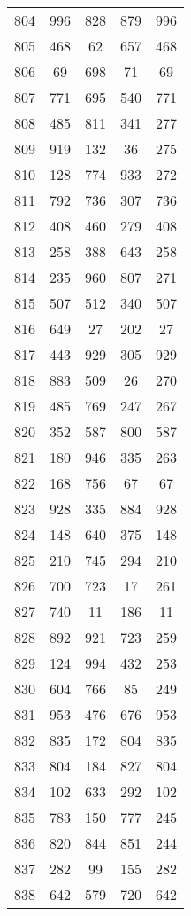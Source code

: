 \documentclass[a4paper,10pt,ngerman]{scrartcl}
\begin{document}
\begin{longtable}[c]{c|c|c|c|c}
    804 & 996 & 828 & 879 & 996 \\
    805 & 468 & 62 & 657 & 468 \\
    806 & 69 & 698 & 71 & 69 \\
    807 & 771 & 695 & 540 & 771 \\
    808 & 485 & 811 & 341 & 277 \\
    809 & 919 & 132 & 36 & 275 \\
    810 & 128 & 774 & 933 & 272 \\
    811 & 792 & 736 & 307 & 736 \\
    812 & 408 & 460 & 279 & 408 \\
    813 & 258 & 388 & 643 & 258 \\
    814 & 235 & 960 & 807 & 271 \\
    815 & 507 & 512 & 340 & 507 \\
    816 & 649 & 27 & 202 & 27 \\
    817 & 443 & 929 & 305 & 929 \\
    818 & 883 & 509 & 26 & 270 \\
    819 & 485 & 769 & 247 & 267 \\
    820 & 352 & 587 & 800 & 587 \\
    821 & 180 & 946 & 335 & 263 \\
    822 & 168 & 756 & 67 & 67 \\
    823 & 928 & 335 & 884 & 928 \\
    824 & 148 & 640 & 375 & 148 \\
    825 & 210 & 745 & 294 & 210 \\
    826 & 700 & 723 & 17 & 261 \\
    827 & 740 & 11 & 186 & 11 \\
    828 & 892 & 921 & 723 & 259 \\
    829 & 124 & 994 & 432 & 253 \\
    830 & 604 & 766 & 85 & 249 \\
    831 & 953 & 476 & 676 & 953 \\
    832 & 835 & 172 & 804 & 835 \\
    833 & 804 & 184 & 827 & 804 \\
    834 & 102 & 633 & 292 & 102 \\
    835 & 783 & 150 & 777 & 245 \\
    836 & 820 & 844 & 851 & 244 \\
    837 & 282 & 99 & 155 & 282 \\
    838 & 642 & 579 & 720 & 642 \\

\end{longtable}
\end{document}
